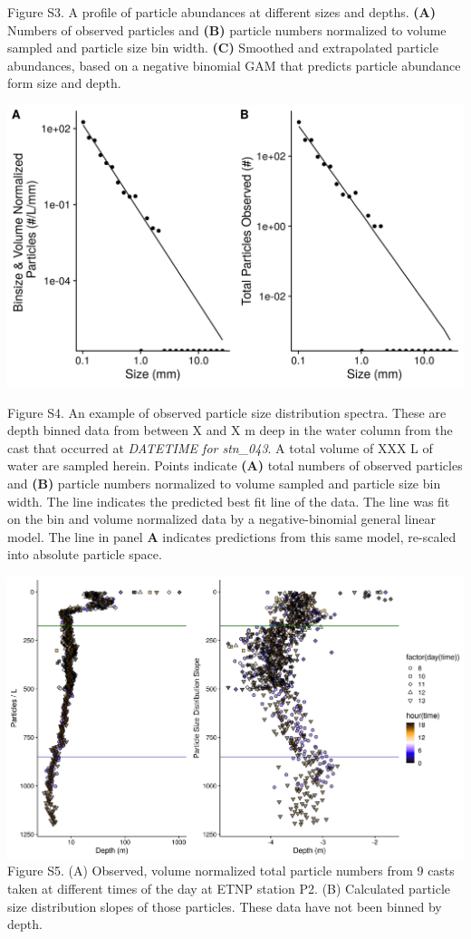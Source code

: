 \documentclass[]{article}
\begin{document}
Figure S3. A profile of particle abundances at different sizes and
depths. \textbf{(A)} Numbers of observed particles and \textbf{(B)}
particle numbers normalized to volume sampled and particle size bin
width. \textbf{(C)} Smoothed and extrapolated particle abundances, based
on a negative binomial GAM that predicts particle abundance form size
and depth.

\includegraphics{../figures/ExamplePSD163m.png}

Figure S4. An example of observed particle size distribution spectra.
These are depth binned data from between X and X m deep in the water
column from the cast that occurred at \emph{DATETIME for stn\_043}. A
total volume of XXX L of water are sampled herein. Points indicate
\textbf{(A)} total numbers of observed particles and \textbf{(B)}
particle numbers normalized to volume sampled and particle size bin
width. The line indicates the predicted best fit line of the data. The
line was fit on the bin and volume normalized data by a
negative-binomial general linear model. The line in panel \textbf{A}
indicates predictions from this same model, re-scaled into absolute
particle space.

\includegraphics{../figures/ParticlesPSDMany.png} Figure S5. (A)
Observed, volume normalized total particle numbers from 9 casts taken at
different times of the day at ETNP station P2. (B) Calculated particle
size distribution slopes of those particles. These data have not been
binned by depth.
\end{document}
